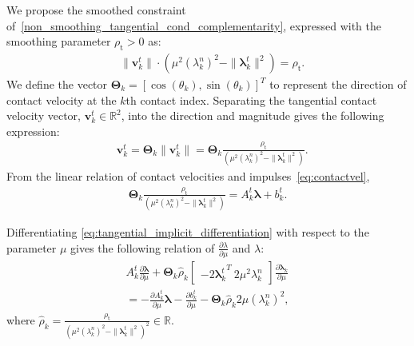 We propose the smoothed constraint of~\eqref{non_smoothing_tangential_cond_complementarity}, expressed with the smoothing parameter $\rho_\mathrm{t}>0$ as:
\begin{align}
    \label{smoothing_tangential_cond}
    &\|\textbf{v}^{t}_{k}\| \cdot (\mu^2(\lambda^{n}_{k})^2-\|\boldsymbol{\lambda}^{t}_{k}\|^2)=\rho_\mathrm{t}.
\end{align}
We define the vector $\mathbf{\Theta}_{k}=[\cos(\theta_{k}),\sin(\theta_{k})]^{T}$ to represent the direction of contact velocity at the $k$th contact index. Separating the tangential contact velocity vector, $\textbf{v}^{t}_{k}\in\mathbb{R}^2$,  into the direction and magnitude gives the following expression:
\begin{align}
    &\textbf{v}^{t}_{k} = 
     \mathbf{\Theta}_{k}\|\textbf{v}^{t}_{k}\|=
     \mathbf{\Theta}_{k}\frac{\rho_\mathrm{t}}{(\mu^2(\lambda^{n}_{k})^2-\|\boldsymbol{\lambda}^{t}_{k}\|^2)}.
\end{align}
From the linear relation of contact velocities and impulses~\eqref{eq:contactvel},
\begin{align}
    \label{eq:tangential_implicit_differentiation}
     \mathbf{\Theta}_{k}\frac{\rho_\mathrm{t}}{(\mu^2(\lambda^{n}_{k})^2-\|\boldsymbol{\lambda}^{t}_{k}\|^2)} = A^t_{k} \boldsymbol{\lambda} + b^t_k.
\end{align}


Differentiating \eqref{eq:tangential_implicit_differentiation} with respect to the parameter $\mu$ gives the following relation of $\frac{\partial{\lambda}}{\partial \mu}$ and ${\lambda}$:
\begin{align}
    \label{tangential_smoothed_contact_gradient_equation}
   A^t_{k} \frac{\partial \boldsymbol{\lambda}}{\partial \mu}+\mathbf{\Theta}_{k} \hat{\rho}_{k} 
    \begin{bmatrix} -2{\boldsymbol{\lambda}^{t}_{k}}^T\ 2\mu^2\lambda^{n}_{k} \end{bmatrix} \frac{\partial \boldsymbol{\lambda}_k}{\partial \mu}\nonumber\\
    = - \frac{\partial A^t_{k}}{\partial \mu} \boldsymbol{\lambda} - \frac{\partial b^t_k}{\partial \mu}-\mathbf{\Theta}_{k}\hat{\rho}_{k} 2\mu(\lambda^{n}_{k})^2,
\end{align}
where $\hat{\rho}_{k}=\frac{\rho_\mathrm{t}}{(\mu^2(\lambda^{n}_{k})^2-\|\boldsymbol{\lambda}^{t}_{k}\|^2)^2} \in \mathbb{R}$.

